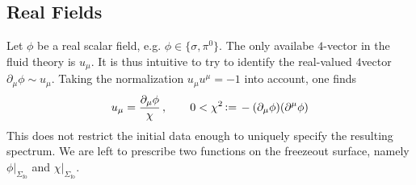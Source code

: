 \subsection{Real Fields}
\label{sec:FluidFromRealScalar}

Let $\phi$ be a real scalar field, e.g. $\phi\in\{\sigma,\pi^0\}$. The only availabe $4$-vector in the fluid theory is $u_\mu$. It is thus intuitive to try to identify the real-valued $4$vector $\partial_\mu\phi\sim u_\mu$. Taking the normalization $u_\mu u^\mu=-1$ into account, one finds
\begin{equation}
    u_\mu=\frac{\partial_\mu\phi}{\chi}\,,\qquad0<\chi^2{\,\vcentcolon=\,}-(\partial_\mu\phi)(\partial^\mu\phi)
\end{equation}
This does not restrict the initial data enough to uniquely specify the resulting spectrum. We are left to prescribe two functions on the freezeout surface, namely $\phi\vert_{\Sigma_{\text{fo}}}$ and $\chi\vert_{\Sigma_{\text{fo}}}$.

